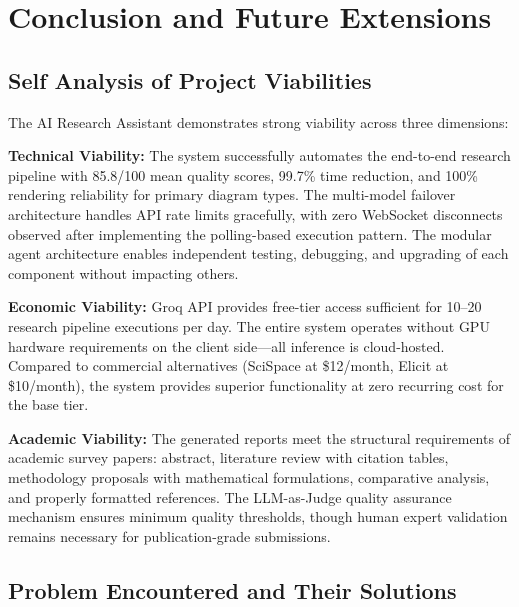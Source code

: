 \chapter{Conclusion and Future Extensions}

\section{Self Analysis of Project Viabilities}

The AI Research Assistant demonstrates strong viability across three dimensions:

\textbf{Technical Viability:} The system successfully automates the end-to-end research pipeline with 85.8/100 mean quality scores, 99.7\% time reduction, and 100\% rendering reliability for primary diagram types. The multi-model failover architecture handles API rate limits gracefully, with zero WebSocket disconnects observed after implementing the polling-based execution pattern. The modular agent architecture enables independent testing, debugging, and upgrading of each component without impacting others.

\textbf{Economic Viability:} Groq API provides free-tier access sufficient for 10--20 research pipeline executions per day. The entire system operates without GPU hardware requirements on the client side---all inference is cloud-hosted. Compared to commercial alternatives (SciSpace at \$12/month, Elicit at \$10/month), the system provides superior functionality at zero recurring cost for the base tier.

\textbf{Academic Viability:} The generated reports meet the structural requirements of academic survey papers: abstract, literature review with citation tables, methodology proposals with mathematical formulations, comparative analysis, and properly formatted references. The LLM-as-Judge quality assurance mechanism ensures minimum quality thresholds, though human expert validation remains necessary for publication-grade submissions.

\section{Problem Encountered and Their Solutions}

